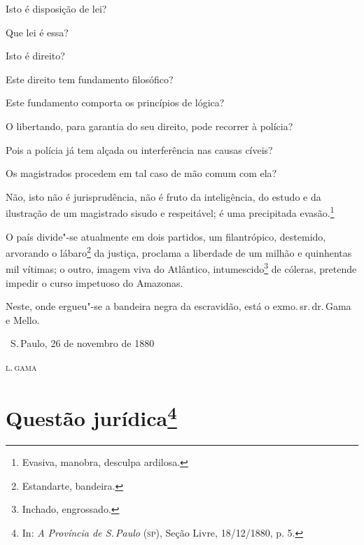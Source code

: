 Isto é disposição de lei?

Que lei é essa?

Isto é direito?

Este direito tem fundamento filosófico?

Este fundamento comporta os princípios de lógica?

O libertando, para garantia do seu direito, pode recorrer à polícia?

Pois a polícia já tem alçada ou interferência nas causas cíveis?

Os magistrados procedem em tal caso de mão comum com ela?

Não, isto não é jurisprudência, não é fruto da inteligência, do estudo e
da ilustração de um magistrado sisudo e respeitável; é uma precipitada
evasão.\footnote{Evasiva, manobra, desculpa ardilosa.}

O país divide"-se atualmente em dois partidos, um filantrópico,
destemido, arvorando o lábaro\footnote{Estandarte, bandeira.} da
justiça, proclama a liberdade de um milhão e quinhentas mil vítimas; o
outro, imagem viva do Atlântico, intumescido\footnote{Inchado,
  engrossado.} de cóleras,
pretende impedir o curso impetuoso do Amazonas.

Neste, onde ergueu"-se a bandeira negra da escravidão, está o exmo.\,sr.\,dr.\,Gama e Mello.

\bigskip

\hfill\ S.\,Paulo, 26 de novembro de 1880\smallskip

\hfill\textsc{l.\,gama}



\chapter{Questão jurídica\footnote[*]{In: \emph{A Província de S.\,Paulo} (\textsc{sp}), Seção Livre, 18/12/1880, p. 5.}} %

